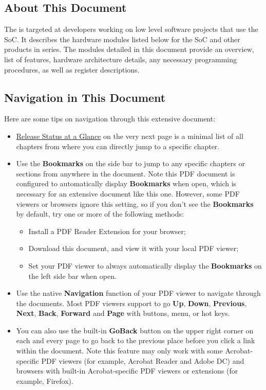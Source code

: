 \thispagestyle{empty}

\setcounter{page}{2}

\subsection*{About This Document}


The {\bfseries \chipname{}  } is targeted at developers working on low level software projects that use the \chipname{} SoC. It describes the hardware modules listed below for the \chipname{} SoC and other products in \chipname{} series. The modules detailed in this document provide an overview, list of features, hardware architecture details, any necessary programming procedures, as well as register descriptions.

\subsection*{Navigation in This Document}
Here are some tips on navigation through this extensive document:
\begin{itemize}
    \item \hyperref[tab:release-status]{Release Status at a Glance} on the very next page is a minimal list of all chapters from where you can directly jump to a specific chapter.
    \item Use the \textbf{Bookmarks} on the side bar to jump to any specific chapters or sections from anywhere in the document. Note this PDF document is configured to automatically display \textbf{Bookmarks} when open, which is necessary for an extensive document like this one. However, some PDF viewers or browsers ignore this setting, so if you don't see the \textbf{Bookmarks} by default, try one or more of the following methods:
    \begin{itemize}
        \item Install a PDF Reader Extension for your browser;
        \item Download this document, and view it with your local PDF viewer;
        \item Set your PDF viewer to always automatically display the \textbf{Bookmarks} on the left side bar when open.
    \end{itemize}
    \item Use the native \textbf{Navigation} function of your PDF viewer to navigate through the documents. Most PDF viewers support to go \textbf{Up}, \textbf{Down}, \textbf{Previous}, \textbf{Next}, \textbf{Back}, \textbf{Forward} and \textbf{Page} with buttons, menu, or hot keys.
    \item You can also use the built-in \textbf{GoBack} button on the upper right corner on each and every page to go back to the previous place before you click a link within the document. Note this feature may only work with some Acrobat-specific PDF viewers (for example, Acrobat Reader and Adobe DC) and browsers with built-in Acrobat-specific PDF viewers or extensions (for example, Firefox).
\end{itemize}
